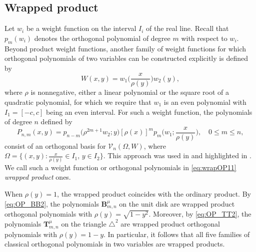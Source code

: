\documentclass{amsart}
\theoremstyle{remark}
\def\Bb{{\bm B}}
\def\Tb{{\bm T}}
\def\CV{{\mathcal V}}
\begin{document}
\subsection{Wrapped product} 
Let $w_i$ be a weight function on the interval $I_i$ of the real line. Recall that $p_m(w_i)$ denotes the orthogonal 
polynomial of degree $m$ with respect to $w_i$. Beyond product weight functions, another family of weight
functions for which orthogonal polynomials of two variables can be constructed explicitly is defined by 
\begin{equation} \label{eq:wrap11}
       W(x,y) = w_1\bigg(\frac{x}{\rho(y)} \bigg) w_2(y),
\end{equation}
where $\rho$ is nonnegative, either a linear polynomial or the square root of a quadratic polynomial, for which 
we require that $w_1$ is an even polynomial with $I_1 = [-c,c]$ being an even interval. 
For such a weight function, the polynomials of degree $n$ defined by 
\begin{equation} \label{eq:wrapOP11}
  P_{n,m}(x,y) = p_{n-m} \big(\rho^{2m+1} w_2; y\big) [\rho(x)]^m p_m\bigg(w_1; \frac{x}{\rho(y)} \bigg), \quad 0 \le m \le n, 
\end{equation}
consist of an orthogonal basis for $\CV_n(\Omega, W)$, where $\Omega = \{(x,y): \frac{x}{\rho(y)} \in I_1, \, y \in I_2\}$.
This approach was used in \cite{Ag} and highlighted in \cite{K75}. 
We call such a weight function or orthogonal polynomials in \eqref{eq:wrapOP11} {\it wrapped product} ones. 

When $\rho(y) = 1$, the wrapped product coincides with the ordinary product. By \eqref{eq:OP_BB2}, 
the polynomials $\Bb_{m,n}^\mu$ on the unit disk are wrapped product orthogonal polynomials with 
$\rho(y) = \sqrt{1-y^2}$. Moreover, by \eqref{eq:OP_TT2}, the polynomials $\Tb_{m,n}^\mu$ 
on the triangle $\triangle^2$ are wrapped product orthogonal polynomials with $\rho(y) = 1-y$. 
In particular, it follows that all five families of classical orthogonal polynomials in two variables are 
wrapped products. 
\medskip
\end{document}
